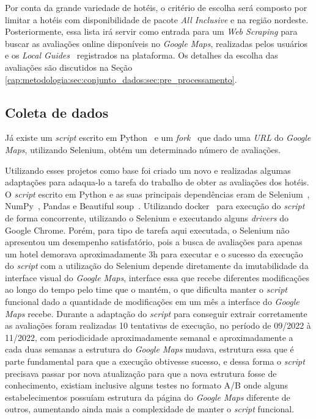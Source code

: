 % 

Por conta da grande variedade de hotéis, o critério de escolha será composto por limitar a hotéis com disponibilidade de pacote \emph{All Inclusive} e na região nordeste. Posteriormente, essa lista irá servir como entrada para um \emph{Web Scraping} para buscar as avaliações online disponíveis no \textit{Google Maps}, realizadas pelos usuários e os \emph{Local Guides}~\cite{google2022localguides} registrados na plataforma. Os detalhes da escolha das avaliações são discutidos na Seção \ref{cap:metodologia:sec:conjunto_dados:sec:pre_processamento}.

\subsection{Coleta de dados}
\label{cap:metodologia:sec:conjunto_dados:sec:coleta_review}

Já existe um \emph{script} escrito em Python~\cite{gaspa93scrapper2023} e um \emph{fork}~\cite{ryuuzakescrapper2023} que dado uma \emph{URL} do \textit{Google Maps}, utilizando Selenium, obtém um determinado número de avaliações.

Utilizando esses projetos como base foi criado um novo e realizadas algumas adaptações para adaqua-lo a tarefa do trabalho de obter as avaliações dos hotéis. O \emph{script} escrito em Python e as suas principais dependências eram de Selenium~\cite{selenium2023}, NumPy~\cite{harris2020array}, Pandas\cite{jeffreback20226702671} e Beautiful soup~\cite{richardson2007beautiful}. Utilizando docker~\cite{merkel2014docker} para execução do \emph{script} de forma concorrente, utilizando o Selenium e executando alguns \textit{drivers} do Google Chrome. Porém, para tipo de tarefa aqui executada, o Selenium não apresentou um desempenho satisfatório, pois a busca de avaliações para apenas um hotel demorava aproximadamente 3h para executar e o sucesso da execução do \emph{script} com a utilização do Selenium depende diretamente da imutabilidade da interface visual do \textit{Google Maps}, interface essa que recebe diferentes modificações ao longo do tempo pelo time que o mantém, o que dificulta manter o \emph{script} funcional dado a quantidade de modificações em um mês a interface do \textit{Google Maps} recebe. Durante a adaptação do \emph{script} para conseguir extrair corretamente as avaliações foram realizadas 10 tentativas de execução, no período de 09/2022 à 11/2022, com periodicidade aproximadamente semanal e aproximadamente a cada duas semanas a estrutura do \textit{Google Maps} mudava, estrutura essa que é parte fundamental para que a execução obtivesse sucesso, e dessa forma o \emph{script} precisava passar por nova atualização para que a nova estrutura fosse de conhecimento, existiam inclusive alguns testes no formato A/B onde alguns estabelecimentos possuíam estrutura da página do \textit{Google Maps} diferente de outros, aumentando ainda mais a complexidade de manter o \emph{script} funcional.

